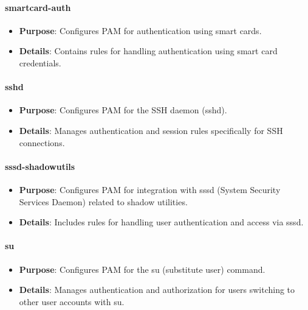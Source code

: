 \documentclass{article}
\begin{document}
\paragraph{smartcard-auth}

\begin{itemize}
    \item \textbf{Purpose}: Configures PAM for authentication using smart cards.
    \item \textbf{Details}: Contains rules for handling authentication using smart card credentials.
\end{itemize}

\paragraph{sshd}

\begin{itemize}
    \item \textbf{Purpose}: Configures PAM for the SSH daemon (sshd).
    \item \textbf{Details}: Manages authentication and session rules specifically for SSH connections.
\end{itemize}

\paragraph{sssd-shadowutils}

\begin{itemize}
    \item \textbf{Purpose}: Configures PAM for integration with sssd (System Security Services Daemon) related to shadow utilities.
    \item \textbf{Details}: Includes rules for handling user authentication and access via sssd.
\end{itemize}

\paragraph{su}

\begin{itemize}
    \item \textbf{Purpose}: Configures PAM for the su (substitute user) command.
    \item \textbf{Details}: Manages authentication and authorization for users switching to other user accounts with su.
\end{itemize}
\end{document}
